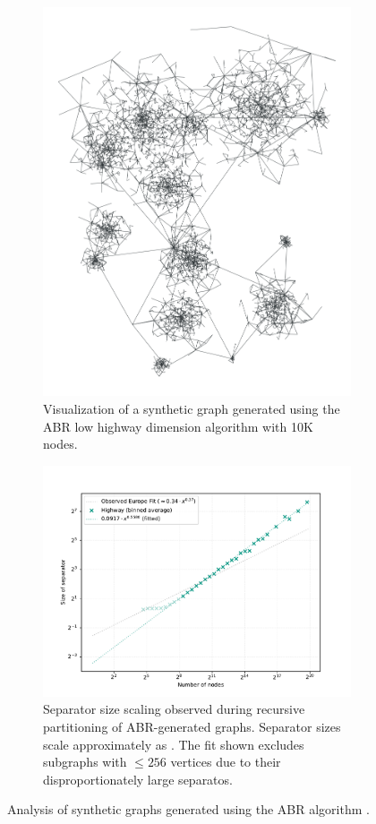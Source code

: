 \begin{figure}[tbhp]
	\centering
	\begin{subfigure}{0.35\linewidth}
		\centering
		\includegraphics[height=\linewidth, angle=90]{graphics/highway.png}
		\caption{Visualization of a synthetic graph generated using the ABR low highway dimension algorithm with 10K nodes.}
		\label{fig:abr_graph_viz}
	\end{subfigure}
	\hfill
	\begin{subfigure}{0.55\linewidth}
		\centering
		\includegraphics[width=\linewidth]{graphics/sep_highway.pdf}
		\caption{Separator size scaling observed during recursive partitioning of ABR-generated graphs. Separator sizes scale approximately as . The fit shown excludes subgraphs with \( \le 256 \) vertices due to their disproportionately large separatos.}
		\label{fig:abr_graph_sep_plot}
	\end{subfigure}
	\caption{Analysis of synthetic graphs generated using the ABR algorithm \cite{abraham_highway_2010}.}
	\label{fig:abr_graph_separators}
\end{figure}


